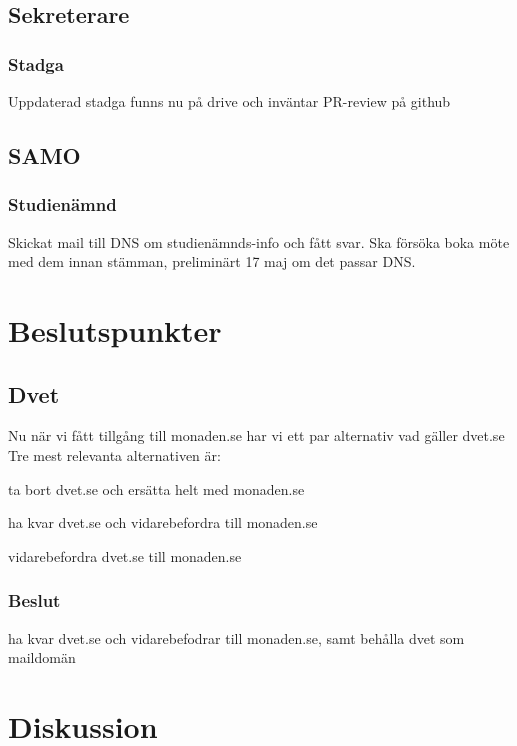 \documentclass[protokoll]{dvd}
\begin{document}
\subsection{Sekreterare}
    \subsubsection{Stadga}
    Uppdaterad stadga funns nu på drive och inväntar PR-review på github

\subsection{SAMO}
    \subsubsection{Studienämnd}
    Skickat mail till DNS om studienämnds-info och fått svar. Ska försöka boka möte med dem innan stämman, preliminärt 17 maj om det passar DNS.

\section{Beslutspunkter}

\subsection{Dvet}
Nu när vi fått tillgång till monaden.se har vi ett par alternativ vad gäller dvet.se
Tre mest relevanta alternativen är:

\begin{attsatser}
    \item ta bort dvet.se och ersätta helt med monaden.se
    \item ha kvar dvet.se och vidarebefordra till monaden.se
    \item vidarebefordra dvet.se till monaden.se
\end{attsatser}

\subsubsection*{Beslut}
    \begin{attsatser}
        \item ha kvar dvet.se och vidarebefodrar till monaden.se, samt behålla dvet som maildomän
    \end{attsatser}

\section{Diskussion}
\end{document}
